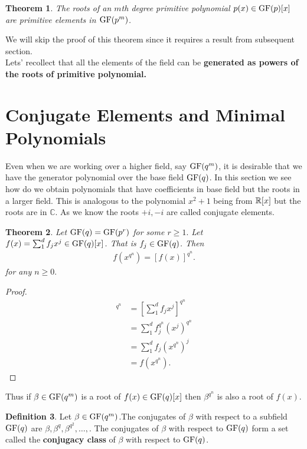 \documentclass[12pt]{article}
\newtheorem{thm}{Theorem}
\theoremstyle{definition}
\newtheorem{defn}[thm]{Definition}
\begin{document}
\begin{thm}
The roots of an $m$th degree primitive polynomial $p(x)\in\text{GF}(p)[x]$ are primitive elements in $\text{GF}(p^m)$.
\end{thm}
We will skip the proof of this theorem since it requires a result from subsequent section.\\

Lets' recollect that all the elements of the field can be \textbf{generated as powers of the roots of primitive polynomial.}

\section{Conjugate Elements and Minimal Polynomials}
Even when we are working over a higher field, say $\text{GF}(q^m)$, it is desirable that we have the generator polynomial over the base field $\text{GF}(q)$. In this section we see how do we obtain polynomials that have coefficients in base field but the roots in a larger field. This is analogous to the polynomial $x^2+1$ being from $\mathbb{R}[x]$ but the roots are in $\mathbb{C}$. As we know the roots $+i,-i$ are called conjugate elements.

\begin{thm}
Let $\text{GF}(q)=\text{GF}(p^r)$ for some $r\geq 1.$ Let $f(x)=\sum_{1}^{d}f_jx^j\in\text{GF}(q)[x]$. That is $f_j\in\text{GF}(q)$. Then
\begin{align*}
f(x^{q^n})=[f(x)]^{q^n}.
\end{align*}
for any $n\geq 0.$
\end{thm}
\begin{proof}
\begin{align*}
[f(x)]^{q^n}&=\left[\sum_{1}^{d}f_jx^j \right]^{q^n}\\
&=\sum_{1}^{d}f_{j}^{q^n}(x^j)^{q^n}\\
&=\sum_{1}^{d}f_j(x^{q^n})^j\\
&=f(x^{q^n}).
\end{align*}
\end{proof}
Thus if $\beta\in\text{GF}(q^m)$ is a root of $f(x)\in\text{GF}(q)[x]$ then $\beta^{q^n}$ is also a root of $f(x).$

\begin{defn}
Let $\beta\in\text{GF}(q^m)$.The conjugates of $\beta$ with respect to a subfield $\text{GF}(q)$ are $\beta,\beta^q,\beta^{q^2},\ldots,$. The conjugates of $\beta$ with respect to $\text{GF}(q)$ form a set called the \textbf{conjugacy class} of $\beta$ with respect to $\text{GF}(q)$.
\end{defn}
\end{document}
